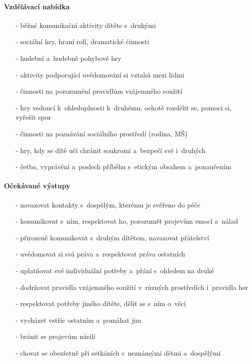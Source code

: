 					\paragraph{Vzdělávací nabídka}

					\begin{itemize}
					\setlength\itemsep{-2mm}
						\item[-]běžné komunikační aktivity dítěte s~druhými
						\item[-]sociální hry, hraní rolí, dramatické činnosti
						\item[-]hudební a~hudebně pohybové hry
						\item[-]aktivity podporující uvědomování si vztahů mezi lidmi
						\item[-]činnosti na porozumění pravidlům vzájemného soužití
						\item[-]hry vedoucí k~ohleduplnosti k~druhému, ochotě rozdělit se, pomoci si, vyřešit spor
						\item[-]činnosti na poznávání sociálního prostředí (rodina, MŠ)
						\item[-]hry, kdy se dítě učí chránit soukromí a~bezpečí své i~druhých
						\item[-]četba, vyprávění a~poslech příběhu s~etickým obsahem a~ponaučením
					\end{itemize}
					
					\paragraph{Očekávané výstupy}

					\begin{itemize}
					\setlength\itemsep{-2mm}
						\item[-]navazovat kontakty s~dospělým, kterému je svěřeno do péče
						\item[-]komunikovat s~ním, respektovat ho, porozumět projevům emocí a~nálad
						\item[-]přirozeně komunikovat s~druhým dítětem, navazovat přátelství
						\item[-]uvědomovat si svá práva a~respektovat práva ostatních
						\item[-]uplatňovat své individuální potřeby a~přání s~ohledem na druhé
						\item[-]dodržovat pravidla vzájemného soužití v~různých prostředích i~pravidla her
						\item[-]respektovat potřeby jiného dítěte, dělit se s~ním o~věci
						\item[-]vycházet vstříc ostatním a~pomáhat jim
						\item[-]bránit se projevům násilí
						\item[-]chovat se obezřetně při setkáních s~neznámými dětmi a~dospělými
					\end{itemize}

